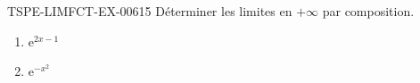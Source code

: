 \begin{exercice}{TSPE-LIMFCT-EX-006}{1}{5}
Déterminer les limites en $+\infty$ par composition.
\begin{enumerate}
  \item $\mathrm{e}^{2x-1}$
  \item $\mathrm{e}^{-x^2}$
\end{enumerate}
\end{exercice}
